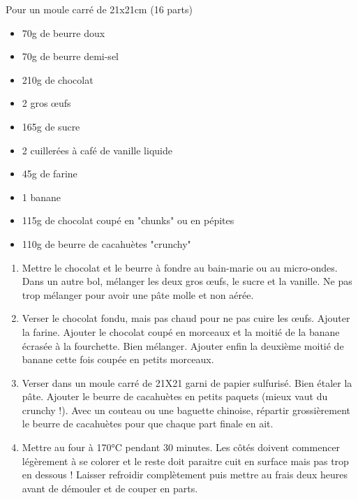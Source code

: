 \bigskip
{}
{Pour un moule carré de 21x21cm (16 parts)}{\begin{itemize}
	\item 70g de beurre doux
	\item 70g de beurre demi-sel
	\item 210g de chocolat
	\item 2 gros œufs
	\item 165g de sucre
	\item 2 cuillerées à café de vanille liquide
	\item 45g de farine
	\item 1 banane
	\item 115g de chocolat coupé en "chunks" ou en pépites
	\item 110g de beurre de cacahuètes "crunchy"
\end{itemize}}
{\begin{enumerate}
	\item Mettre le chocolat et le beurre à fondre au bain-marie ou au micro-ondes. Dans un autre bol, mélanger les deux gros \oe ufs, le sucre et la vanille. Ne pas trop mélanger pour avoir une pâte molle et non aérée. 
	\item Verser le chocolat fondu, mais pas chaud pour ne pas cuire les \oe ufs. Ajouter la farine. Ajouter le chocolat coupé en morceaux et la moitié de la banane écrasée à la fourchette. Bien mélanger. Ajouter enfin la deuxième moitié de banane cette fois coupée en petits morceaux. 
	\item Verser dans un moule carré de 21X21 garni de papier sulfurisé. Bien étaler la pâte. Ajouter le beurre de cacahuètes en petits paquets (mieux vaut du crunchy !). Avec un couteau ou une baguette chinoise, répartir grossièrement le beurre de cacahuètes pour que chaque part finale en ait. 
	\item Mettre au four à 170°C pendant 30 minutes. Les côtés doivent commencer légèrement à se colorer et le reste doit paraitre cuit en surface mais pas trop en dessous ! Laisser refroidir complètement puis mettre au frais deux heures avant de démouler et de couper en parts. 
\end{enumerate}}

